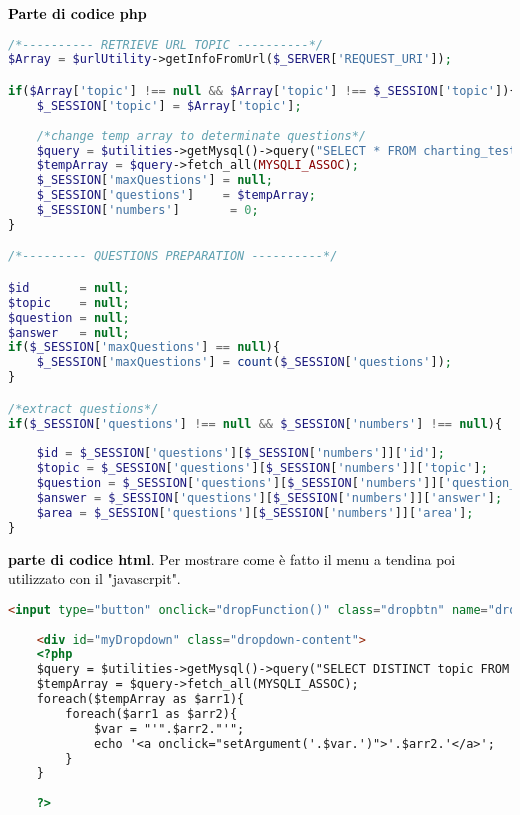 \textbf{\textcolor{black}{Parte di codice php}}\\

\begin{lstlisting}[language=php]
/*---------- RETRIEVE URL TOPIC ----------*/
$Array = $urlUtility->getInfoFromUrl($_SERVER['REQUEST_URI']);

if($Array['topic'] !== null && $Array['topic'] !== $_SESSION['topic']){
	$_SESSION['topic'] = $Array['topic'];
	
	/*change temp array to determinate questions*/
	$query = $utilities->getMysql()->query("SELECT * FROM charting_test_5d WHERE (topic = '{$Array['topic']}')");
	$tempArray = $query->fetch_all(MYSQLI_ASSOC);
	$_SESSION['maxQuestions'] = null;
	$_SESSION['questions']    = $tempArray;
	$_SESSION['numbers']       = 0;
}

/*--------- QUESTIONS PREPARATION ----------*/

$id       = null;
$topic    = null;
$question = null;
$answer   = null;
if($_SESSION['maxQuestions'] == null){
	$_SESSION['maxQuestions'] = count($_SESSION['questions']);
}

/*extract questions*/
if($_SESSION['questions'] !== null && $_SESSION['numbers'] !== null){
	
	$id = $_SESSION['questions'][$_SESSION['numbers']]['id'];
	$topic = $_SESSION['questions'][$_SESSION['numbers']]['topic'];
	$question = $_SESSION['questions'][$_SESSION['numbers']]['question_text'];
	$answer = $_SESSION['questions'][$_SESSION['numbers']]['answer'];
	$area = $_SESSION['questions'][$_SESSION['numbers']]['area'];	
}
\end{lstlisting}

\textcolor{black}{\textbf{parte di codice html}. Per mostrare come è fatto il menu a tendina poi utilizzato con il "javascrpit".}\\

\begin{lstlisting}[language=html]
	 <input type="button" onclick="dropFunction()" class="dropbtn" name="dropdown" value="Seleziona capitolo">
	
	<div id="myDropdown" class="dropdown-content">
	<?php
	$query = $utilities->getMysql()->query("SELECT DISTINCT topic FROM charting_test_5d");
	$tempArray = $query->fetch_all(MYSQLI_ASSOC);
	foreach($tempArray as $arr1){
		foreach($arr1 as $arr2){
			$var = "'".$arr2."'";
			echo '<a onclick="setArgument('.$var.')">'.$arr2.'</a>';
		}
	}		
	
	?>			
\end{lstlisting}

